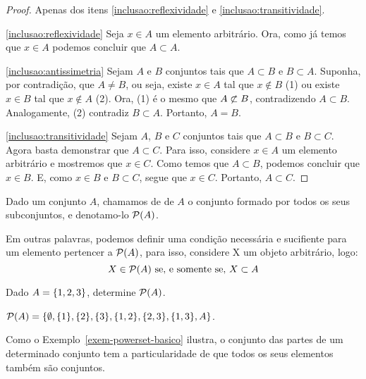 \begin{proof}
	Apenas dos itens \ref{inclusao:reflexividade} e \ref{inclusao:transitividade}.

	\ref{inclusao:reflexividade}
	Seja $x \in A$ um elemento arbitrário.
	Ora, como já temos que $x \in A$ podemos concluir que $A \subset A$.

	\ref{inclusao:antissimetria}
	Sejam $A$ e $B$ conjuntos tais que $A \subset B$ e $B \subset A$.
	Suponha, por contradição, que $A \ne B$, ou seja, existe $x \in A$ tal que $x \notin B$ (1) ou existe $x \in B$ tal que $x \notin A$ (2).
	Ora, (1) é o mesmo que $A \not\subset B$, contradizendo $A \subset B$.
	Analogamente, (2) contradiz $B \subset A$.
	Portanto, $A = B$.

	\ref{inclusao:transitividade}
	Sejam $A$, $B$ e $C$ conjuntos tais que $A \subset B$ e $B \subset C$.
	Agora basta demonstrar que $A \subset C$.
	Para isso, considere $x \in A$ um elemento arbitrário e mostremos que $x \in C$.
	Como temos que $A \subset B$, podemos concluir que $x \in B$.
	E, como $x \in B$ e $B \subset C$, segue que $x \in C$.
	Portanto, $A \subset C$.
\end{proof}

\begin{definition}
\label{def:powerset}
Dado um conjunto $A$, chamamos de  de $A$ o conjunto formado por todos os seus subconjuntos, e denotamo-lo $\mathcal{P}(A)$.
\end{definition}

Em outras palavras, podemos definir uma condição necessária e sucifiente para um elemento pertencer a $\mathcal{P}(A)$, para isso, considere X um objeto arbitrário, logo:
$$ X \in \mathcal{P}(A) \text{ se, e somente se, } X \subset A $$

\begin{example}
\label{exem-powerset-basico}
Dado $A = \left\{ 1,2,3\right\}$, determine $\mathcal{P}(A)$.
\end{example}

\begin{solution}

$\mathcal{P}(A)=\{\emptyset,\{1\}, \{2\}, \{3\}, \{1,2\}, \{2,3\}, \{1,3\},A\}$.
\end{solution}

\begin{remark}
Como o Exemplo~\ref{exem-powerset-basico} ilustra, o conjunto das partes de um determinado conjunto tem a particularidade de que todos os seus elementos também são conjuntos.
\end{remark}

